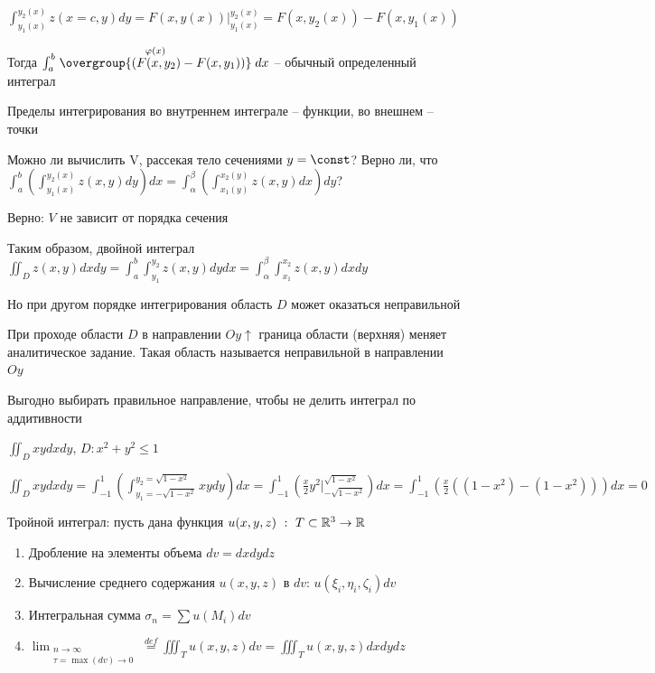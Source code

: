 \documentclass[12pt]{article}
\begin{document}
    $\int^{y_2(x)}_{y_1(x)} z(x = c, y) dy = F(x, y(x)) \Big|^{y_2(x)}_{y_1(x)} = F(x, y_2(x)) - F(x, y_1(x))$

    Тогда $\int^b_a \stackrel{\varphi(x)}{\overgroup{(F(x, y_2) - F(x, y_1))}} dx$ -- обычный определенный интеграл

    Пределы интегрирования во внутреннем интеграле -- функции, во внешнем -- точки

    Можно ли вычислить V, рассекая тело сечениями $y = \const$? Верно ли, что $\int_a^b \left(\int_{y_1(x)}^{y_2(x)} z(x, y) dy\right) dx = \int_\alpha^\beta \left(\int_{x_1(y)}^{x_2(y)} z(x, y) dx\right) dy$?

    Верно: $V$ не зависит от порядка сечения

    Таким образом, двойной интеграл $\iint_D z(x, y) dxdy = \int_a^b \int_{y_1}^{y_2} z(x, y) dydx = \int_\alpha^\beta \int_{x_1}^{x_2} z(x, y) dxdy$

    Но при другом порядке интегрирования область $D$ может оказаться неправильной

    \Def При проходе области $D$ в направлении $Oy \uparrow$ граница области (верхняя) меняет аналитическое задание. Такая область называется неправильной в направлении $Oy$

    Выгодно выбирать правильное направление, чтобы не делить интеграл по аддитивности

    \Ex $\iint_D xy dx dy$, $D : x^2 + y^2 \leq 1$

    $\iint_D xy dx dy = \int_{-1}^1 \left(\int_{y_1 = -\sqrt{1-x^2}}^{y_2 = \sqrt{1-x^2}} xy dy\right) dx = \int_{-1}^1 \left(\frac{x}{2} y^2 \Big|_{-\sqrt{1-x^2}}^{\sqrt{1-x^2}}\right) dx =
    \int_{-1}^1 \left(\frac{x}{2} ((1 - x^2) - (1 - x^2))\right) dx = 0$

    \hypertarget{tripleintegral}{}

    \Def Тройной интеграл: пусть дана функция $u(x, y, z) \ : \ T \subset \mathbb{R}^3 \rightarrow \mathbb{R}$

    \begin{enumerate}
        \item Дробление на элементы объема $dv = dxdydz$

        \item Вычисление среднего содержания $u(x, y, z)$ в $dv$: $u(\xi_i, \eta_i, \zeta_i) dv$

        \item Интегральная сумма $\sigma_n = \sum u(M_i) dv$

        \item $\lim_{\substack{n \to \infty \\ \tau = \max (dv) \to 0}} \stackrel{def}{=} \iiint_T u(x, y, z) dv = \iiint_T u(x, y, z) dxdydz$
    \end{enumerate}
\end{document}
